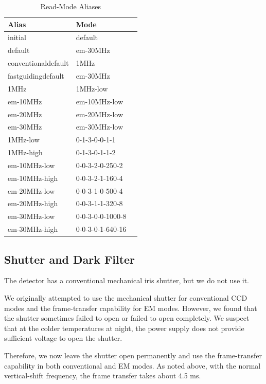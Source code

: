 \begin{table}
\caption{Read-Mode Aliases}
\label{table:read-mode-aliases}
\begin{center}
\begin{tabular}{lll}
\hline
Alias&Mode\\
\hline
 initial&default\\
 default&em-30MHz\\
 conventionaldefault&1MHz\\
 fastguidingdefault&em-30MHz\\
 1MHz&1MHz-low\\
 em-10MHz&em-10MHz-low\\
 em-20MHz&em-20MHz-low\\
 em-30MHz&em-30MHz-low\\
 1MHz-low&0-1-3-0-0-1-1\\
 1MHz-high&0-1-3-0-1-1-2\\
 em-10MHz-low&0-0-3-2-0-250-2\\
 em-10MHz-high&0-0-3-2-1-160-4\\
 em-20MHz-low&0-0-3-1-0-500-4\\
 em-20MHz-high&0-0-3-1-1-320-8\\
 em-30MHz-low&0-0-3-0-0-1000-8\\
 em-30MHz-high&0-0-3-0-1-640-16\\
 \hline
\end{tabular}
\end{center}
\end{table}

\subsection{Shutter and Dark Filter}

\label{section:shutter}

The detector has a conventional mechanical iris shutter, but we do not use it.

We originally attempted to use the mechanical shutter for conventional CCD modes and the frame-transfer capability for EM modes. However, we found that the shutter sometimes failed to open or failed to open completely. We suspect that at the colder temperatures at night, the power supply does not provide sufficient voltage to open the shutter. 

Therefore, we now leave the shutter open permanently and use the frame-transfer capability in both conventional and EM modes. As noted above, with the normal vertical-shift frequency, the frame transfer takes about 4.5 ms.

